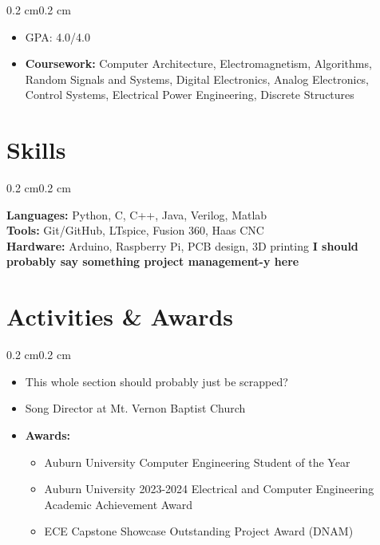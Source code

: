 \documentclass[10pt, letterpaper]{article}
\newenvironment{highlights}{
    \begin{itemize}[topsep=0.10 cm,parsep=0.10 cm,partopsep=0pt,itemsep=0pt,leftmargin=0.4 cm + 10pt]
}{
    \end{itemize}
}
\newenvironment{onecolentry}{
    \begin{adjustwidth}{0.2 cm}{0.2 cm}
}{
    \end{adjustwidth}
}
\let\hrefWithoutArrow\href
\renewcommand{\href}[2]{\hrefWithoutArrow{#1}{#2 \raisebox{.15ex}{\footnotesize \faExternalLink*}}}
\begin{document}
        \vspace{0.10 cm}
        \begin{onecolentry}
            \begin{highlights}
                \item GPA: 4.0/4.0 %
                \item \textbf{Coursework:} Computer Architecture, Electromagnetism, Algorithms, Random Signals and Systems, Digital Electronics, Analog Electronics, Control Systems, Electrical Power Engineering, Discrete Structures
            \end{highlights}
        \end{onecolentry}


    \section{Skills}
        \begin{onecolentry}
            \textbf{Languages:} Python, C, C++, Java, Verilog, Matlab \\
            \textbf{Tools:} Git/GitHub, LTspice, Fusion 360, Haas CNC \\
            \textbf{Hardware:} Arduino, Raspberry Pi, PCB design, 3D printing
            \textbf{I should probably say something project management-y here}
        \end{onecolentry}

    \section{Activities \& Awards}
        \begin{onecolentry}
            \begin{highlights}
                \item This whole section should probably just be scrapped?
                \item Song Director at Mt. Vernon Baptist Church
                \item \textbf{Awards:} 
                \begin{highlights}
                    \item Auburn University Computer Engineering Student of the Year
                    \item Auburn University 2023-2024 Electrical and Computer Engineering Academic Achievement Award
                    \item ECE Capstone Showcase Outstanding Project Award (DNAM)
                \end{highlights}
            \end{highlights}
        \end{onecolentry}
\end{document}
